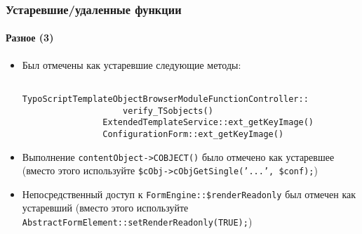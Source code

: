 \begin{frame}[fragile]
	\frametitle{Устаревшие/удаленные функции}
	\framesubtitle{Разное (3)}

	\begin{itemize}
		\item Был отмечены как устаревшие следующие методы:

			\begin{lstlisting}
				TypoScriptTemplateObjectBrowserModuleFunctionController::
				    verify_TSobjects()
				ExtendedTemplateService::ext_getKeyImage()
				ConfigurationForm::ext_getKeyImage()
			\end{lstlisting}

 		\item Выполнение \texttt{contentObject->COBJECT()} было отмечено как устаревшее\newline
 			\small(вместо этого используйте \texttt{\$cObj->cObjGetSingle('...', \$conf);})\normalsize

		\item Непосредственный доступ к \texttt{FormEngine::\$renderReadonly} был отмечен как устаревший\newline
			\small(вместо этого используйте \texttt{AbstractFormElement::setRenderReadonly(TRUE);})\normalsize

	\end{itemize}

\end{frame}


